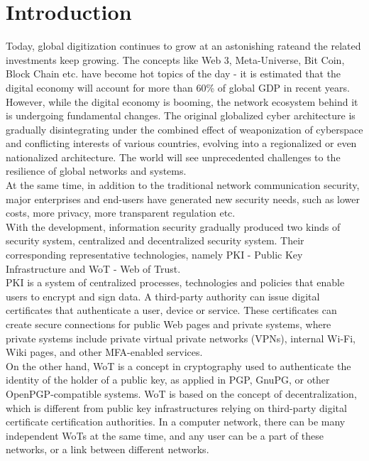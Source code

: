 \section{Introduction}
Today, global digitization continues to grow at an astonishing rateand the related investments keep 
growing.  The concepts like Web 3, Meta-Universe, Bit Coin, Block Chain etc. have become hot topics of 
the day - it is estimated that the digital economy will account for more than 60\% 
of global GDP in recent years\cite{b15}. However, while the digital economy is booming, the network 
ecosystem behind it is undergoing fundamental changes. The original globalized cyber 
architecture is gradually disintegrating under the combined effect of weaponization of 
cyberspace and conflicting interests of various countries, evolving into a regionalized 
or even nationalized architecture. The world will see unprecedented challenges to the resilience 
of global networks and systems\cite{b5}.
\\
At the same time, in addition to the traditional network communication security, 
major enterprises and end-users have generated new security needs, such as lower costs, 
more privacy, more transparent regulation etc.
\\
With the development, information security gradually produced two kinds of security 
system, centralized and decentralized security system. Their corresponding 
representative technologies, namely PKI - Public Key Infrastructure and WoT - Web of Trust.
\\
PKI is a system of centralized processes, technologies and policies that enable users 
to encrypt and sign data\cite{b5}. A third-party authority can issue digital certificates that 
authenticate a user, device or service. These certificates can create secure connections 
for public Web pages and private systems, where private systems include private virtual 
private networks (VPNs), internal Wi-Fi, Wiki pages, and other MFA-enabled services\cite{b6}.
\\
On the other hand, WoT is a concept in cryptography used to authenticate the identity 
of the holder of a public key, as applied in PGP\cite{b7}, GnuPG\cite{b8}, or other OpenPGP-compatible 
systems\cite{b9}. WoT is based on the concept of decentralization, which is different from public key 
infrastructures relying on third-party digital certificate certification authorities. 
In a computer network, there can be many independent WoTs at the same time, and any user 
can be a part of these networks, or a link between different networks\cite{b7}.
